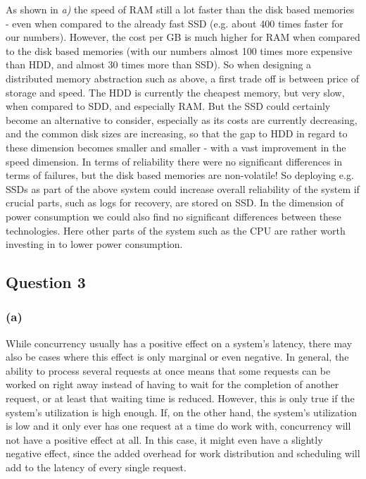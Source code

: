 \documentclass[12pt,a4paper]{article}
\begin{document}
As shown in \emph{a)} the speed of RAM still a lot faster than the disk based memories - even when compared to the already fast SSD (e.g. about 400 times faster for our numbers). However, the cost per GB is much higher for RAM when compared to the disk based memories (with our numbers almost 100 times more expensive than HDD, and almost 30 times more than SSD). So when designing a distributed memory abstraction such as above, a first trade off is between price of storage and speed. The HDD is currently the cheapest memory, but very slow, when compared to SDD, and especially RAM. But the SSD could certainly become an alternative to consider, especially as its costs are currently decreasing, and the common disk sizes are increasing, so that the gap to HDD in regard to these dimension becomes smaller and smaller - with a vast improvement in the speed dimension. In terms of reliability there were no significant differences in terms of failures, but the disk based memories are non-volatile! So deploying e.g. SSDs as part of the above system could increase overall reliability of the system if crucial parts, such as logs for recovery, are stored on SSD. In the dimension of power consumption we could also find no significant differences between these technologies. Here other parts of the system such as the CPU are rather worth investing in to lower power consumption.

\subsection*{Question 3}
\label{sec:eq3}

\subsubsection*{(a)}
While concurrency usually has a positive effect on a system's latency, there may also be cases where this effect is only marginal or even negative. In general, the ability to process several requests at once means that some requests can be worked on right away instead of having to wait for the completion of another request, or at least that waiting time is reduced. However, this is only true if the system's utilization is high enough. If, on the other hand, the system's utilization is low and it only ever has one request at a time do work with, concurrency will not have a positive effect at all. In this case, it might even have a slightly negative effect, since the added overhead for work distribution and scheduling will add to the latency of every single request.
\end{document}
